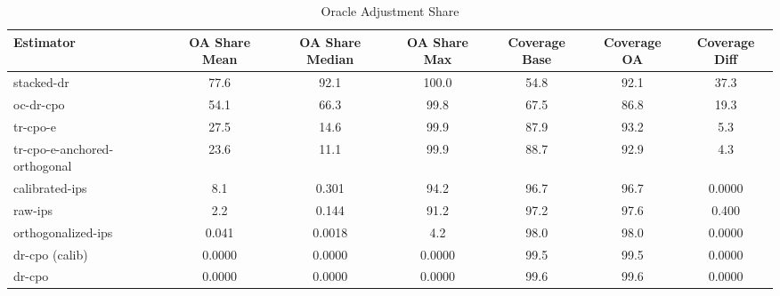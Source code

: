 \begin{table}[htbp]
\centering
\caption{Oracle Adjustment Share}
\label{tab:A4}
\begin{tabular}{l|cccccc}
\toprule
Estimator & OA Share Mean & OA Share Median & OA Share Max & Coverage Base & Coverage OA & Coverage Diff \\
\midrule
stacked-dr & 77.6 & 92.1 & 100.0 & 54.8 & 92.1 & 37.3 \\
oc-dr-cpo & 54.1 & 66.3 & 99.8 & 67.5 & 86.8 & 19.3 \\
tr-cpo-e & 27.5 & 14.6 & 99.9 & 87.9 & 93.2 & 5.3 \\
tr-cpo-e-anchored-orthogonal & 23.6 & 11.1 & 99.9 & 88.7 & 92.9 & 4.3 \\
calibrated-ips & 8.1 & 0.301 & 94.2 & 96.7 & 96.7 & 0.0000 \\
raw-ips & 2.2 & 0.144 & 91.2 & 97.2 & 97.6 & 0.400 \\
orthogonalized-ips & 0.041 & 0.0018 & 4.2 & 98.0 & 98.0 & 0.0000 \\
dr-cpo (calib) & 0.0000 & 0.0000 & 0.0000 & 99.5 & 99.5 & 0.0000 \\
dr-cpo & 0.0000 & 0.0000 & 0.0000 & 99.6 & 99.6 & 0.0000 \\
\bottomrule
\end{tabular}
\end{table}
